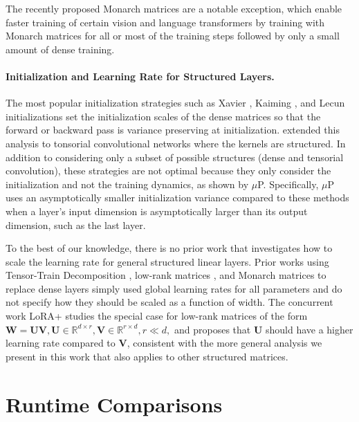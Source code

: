 \documentclass{article}
\newcommand{\mbf}[1]{{\boldsymbol{\mathbf{#1}}}}
\newcommand{\bm}{\mbf}
\theoremstyle{plain}
\theoremstyle{definition}
\theoremstyle{remark}
\newcommand{\mup}{$\mu$P\xspace}
\newcommand{\R}{\mathbb{R}}
\begin{document}
The recently proposed Monarch matrices \citep{dao2022monarch} are a notable exception, which enable faster training of certain vision and language transformers by training with Monarch matrices for all or most of the training steps followed by only a small amount of dense training.

\paragraph{Initialization and Learning Rate for Structured Layers.}
The most popular initialization strategies such as Xavier \citep{glorot2010understanding}, Kaiming \citep{he2015delving}, and Lecun \citep{lecun2002efficient} initializations set the initialization scales of the dense matrices so that the forward or backward pass is variance preserving at initialization. \citet{pan2022unified} extended this analysis to tonsorial convolutional networks where the kernels are structured. In addition to considering only a subset of possible structures (dense and tensorial convolution), these strategies are not optimal because they only consider the initialization and not the training dynamics, as shown by \mup \citep{yang2021v}. Specifically, \mup uses an asymptotically smaller initialization variance compared to these methods when a layer's input dimension is asymptotically larger than its output dimension, such as the last layer.

To the best of our knowledge, there is no prior work that investigates how to scale the learning rate for general structured linear layers. Prior works using Tensor-Train Decomposition \citep{chekalina2023gpttrans}, low-rank matrices \citep{lialin2023relora}, and Monarch matrices \citep{dao2022monarch} to replace dense layers simply used global learning rates for all parameters and do not specify how they should be scaled as a function of width. The concurrent work LoRA+ \citep{hayou2024lora+} studies the special case for low-rank matrices of the form $\bm{W} = \bm{U}\bm{V}, \bm{U} \in \R^{d\times r}, \bm{V} \in \R^{r\times d}, r \ll d,$ and proposes that $\bm{U}$ should have a higher learning rate compared to $\bm{V}$, consistent with the more general analysis we present in this work that also applies to other structured matrices.


\section{Runtime Comparisons} \label{app:runtime}
\end{document}
